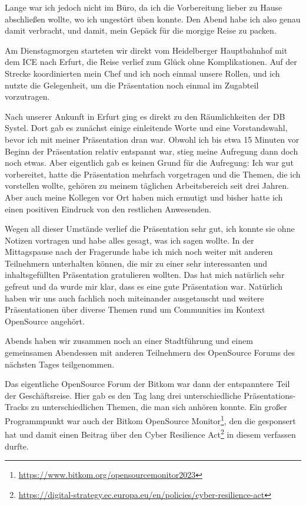 Lange war ich jedoch nicht im Büro, da ich die Vorbereitung lieber zu Hause abschließen wollte, wo ich ungestört üben konnte.
Den Abend habe ich also genau damit verbracht, und damit, mein Gepäck für die morgige Reise zu packen.

Am Dienstagmorgen starteten wir direkt vom Heidelberger Hauptbahnhof mit dem ICE nach Erfurt, die Reise verlief zum Glück ohne Komplikationen.
Auf der Strecke koordinierten mein Chef und ich noch einmal unsere Rollen, und ich nutzte die Gelegenheit, um die Präsentation noch einmal im Zugabteil vorzutragen.

Nach unserer Ankunft in Erfurt ging es direkt zu den Räumlichkeiten der DB Systel.
Dort gab es zunächst einige einleitende Worte und eine Vorstandswahl, bevor ich mit meiner Präsentation dran war.
Obwohl ich bis etwa 15 Minuten vor Beginn der Präsentation relativ entspannt war, stieg meine Aufregung dann doch noch etwas.
Aber eigentlich gab es keinen Grund für die Aufregung:
Ich war gut vorbereitet, hatte die Präsentation mehrfach vorgetragen und die Themen, die ich vorstellen wollte, gehören zu meinem täglichen Arbeitsbereich seit drei Jahren.
Aber auch meine Kollegen vor Ort haben mich ermutigt und bisher hatte ich einen positiven Eindruck von den restlichen Anwesenden.

Wegen all dieser Umstände verlief die Präsentation sehr gut, ich konnte sie ohne Notizen vortragen und habe alles gesagt, was ich sagen wollte.
In der Mittagspause nach der Fragerunde habe ich mich noch weiter mit anderen Teilnehmern unterhalten können, die mir zu einer sehr interessanten und inhaltsgefüllten Präsentation gratulieren wollten.
Das hat mich natürlich sehr gefreut und da wurde mir klar, dass es eine gute Präsentation war.
Natürlich haben wir uns auch fachlich noch miteinander ausgetauscht und weitere Präsentationen über diverse Themen rund um Communities im Kontext OpenSource angehört.

Abends haben wir zusammen noch an einer Stadtführung und einem gemeinsamen Abendessen mit anderen Teilnehmern des OpenSource Forums des nächsten Tages teilgenommen.

Das eigentliche OpenSource Forum der Bitkom war dann der entspanntere Teil der Geschäftsreise.
Hier gab es den Tag lang drei unterschiedliche Präsentations-Tracks zu unterschiedlichen Themen, die man sich anhören konnte.
Ein großer Programmpunkt war auch der Bitkom OpenSource Monitor\footnote{\url{https://www.bitkom.org/opensourcemonitor2023}}, den die \metaeffekt gesponsert hat und damit einen Beitrag über den Cyber Resilience Act\footnote{\url{https://digital-strategy.ec.europa.eu/en/policies/cyber-resilience-act}} in diesem verfassen durfte.

